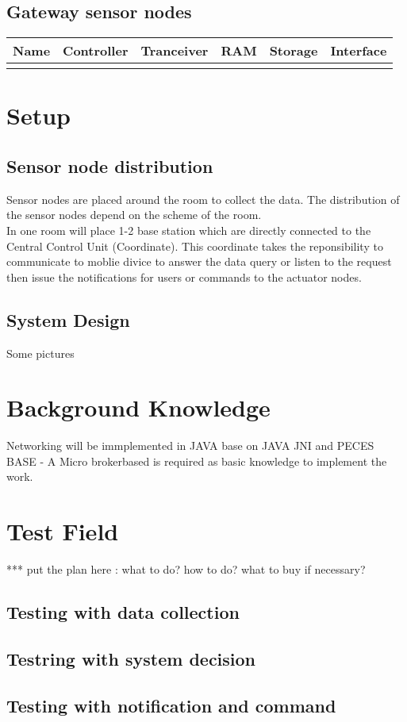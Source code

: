 \documentclass[a4paper, 12pt]{article}
\newcommand{\head}[1]{\textnormal {\textbf{#1}}}
\begin{document}
\subsection{Gateway sensor nodes}

\begin{tabular}{|p{2.5cm}|c|p{2cm}|c|c|c|}
\hline
\head{Name} & \head{Controller} & \head{Tranceiver} & \head{RAM} & \head{Storage} &\head{Interface}\\
\hline
{} &{}&{}&{}&{}&{}\\
\hline
\end{tabular}

\section{Setup}
\subsection{Sensor node distribution}
Sensor nodes are placed around the room to collect the data. The distribution of the sensor nodes depend on the scheme of the room. \\
In one room will place 1-2 base station which are directly connected to the Central Control Unit (Coordinate). This coordinate takes the reponsibility to communicate to moblie divice to answer the data query or listen to the request then issue the notifications for users or commands to the actuator nodes.
\subsection{System Design}
Some pictures
\section{Background Knowledge}
Networking will be immplemented in JAVA base on JAVA JNI and PECES\\
BASE - A Micro brokerbased is required as basic knowledge to implement the work.
\section{Test Field}

*** put the plan here : what to do? how to do? what to buy if necessary?

\subsection{Testing with data collection}
\subsection{Testring with system decision}
\subsection{Testing with notification and command}
\end{document}
